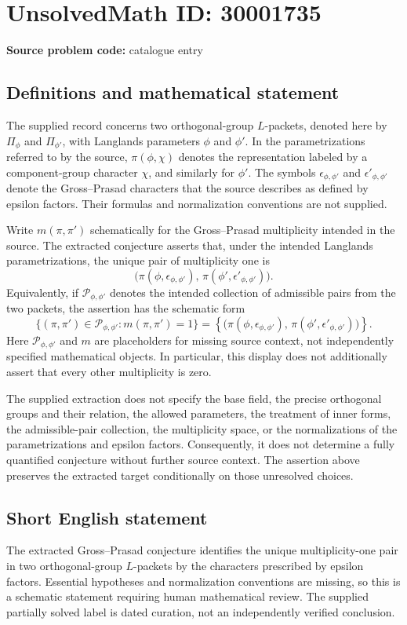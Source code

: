 \documentclass[11pt]{article}
\begin{document}
\section*{UnsolvedMath ID: 30001735}
\textbf{Source problem code:} catalogue entry
\subsection{Definitions and mathematical statement}
The supplied record concerns two orthogonal-group \(L\)-packets, denoted here by \(\Pi_\phi\) and \(\Pi_{\phi'}\), with Langlands parameters \(\phi\) and \(\phi'\). In the parametrizations referred to by the source, \(\pi(\phi,\chi)\) denotes the representation labeled by a component-group character \(\chi\), and similarly for \(\phi'\). The symbols \(\epsilon_{\phi,\phi'}\) and \(\epsilon'_{\phi,\phi'}\) denote the Gross--Prasad characters that the source describes as defined by epsilon factors. Their formulas and normalization conventions are not supplied.

Write \(m(\pi,\pi')\) schematically for the Gross--Prasad multiplicity intended in the source. The extracted conjecture asserts that, under the intended Langlands parametrizations, the unique pair of multiplicity one is
\[
\bigl(\pi(\phi,\epsilon_{\phi,\phi'}),\,
\pi(\phi',\epsilon'_{\phi,\phi'})\bigr).
\]
Equivalently, if \(\mathcal P_{\phi,\phi'}\) denotes the intended collection of admissible pairs from the two packets, the assertion has the schematic form
\[
\bigl\{(\pi,\pi')\in\mathcal P_{\phi,\phi'}:
 m(\pi,\pi')=1\bigr\}
=
\left\{\bigl(\pi(\phi,\epsilon_{\phi,\phi'}),\,
\pi(\phi',\epsilon'_{\phi,\phi'})\bigr)\right\}.
\]
Here \(\mathcal P_{\phi,\phi'}\) and \(m\) are placeholders for missing source context, not independently specified mathematical objects. In particular, this display does not additionally assert that every other multiplicity is zero.

The supplied extraction does not specify the base field, the precise orthogonal groups and their relation, the allowed parameters, the treatment of inner forms, the admissible-pair collection, the multiplicity space, or the normalizations of the parametrizations and epsilon factors. Consequently, it does not determine a fully quantified conjecture without further source context. The assertion above preserves the extracted target conditionally on those unresolved choices.
\subsection{Short English statement}
The extracted Gross--Prasad conjecture identifies the unique multiplicity-one pair in two orthogonal-group \(L\)-packets by the characters prescribed by epsilon factors. Essential hypotheses and normalization conventions are missing, so this is a schematic statement requiring human mathematical review. The supplied partially solved label is dated curation, not an independently verified conclusion.
\end{document}
